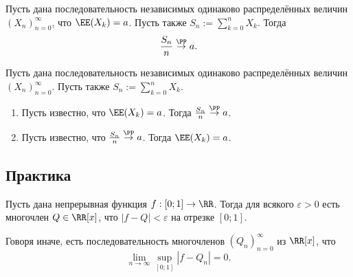 \documentclass[12pt,a4paper]{article}
\newcommand{\probto}{\mathrel{\stackrel{\PP}{\to}}}
\begin{document}
    \begin{theorem}[Хинчина]
        Пусть дана последовательность независимых одинаково распределённых величин $(X_n)_{n=0}^\infty$, что $\EE(X_k) = a$. Пусть также $S_n := \sum_{k=0}^n X_k$. Тогда
        \[\frac{S_n}{n} \probto a.\]
    \end{theorem}

    \begin{theorem}[Колмогорова]
        Пусть дана последовательность независимых одинаково распределённых величин $(X_n)_{n=0}^\infty$. Пусть также $S_n := \sum_{k=0}^n X_k$.
        \begin{enumerate}
            \item Пусть известно, что $\EE(X_k) = a$. Тогда $\frac{S_n}{n} \probto a$.
            \item Пусть известно, что $\frac{S_n}{n} \probto a$. Тогда $\EE(X_k) = a$.
        \end{enumerate}
    \end{theorem}

    \subsection{Практика}

    \begin{theorem}
        Пусть дана непрерывная функция $f: [0; 1] \to \RR$. Тогда для всякого $\varepsilon > 0$ есть многочлен $Q \in \RR[x]$, что $|f - Q| < \varepsilon$ на отрезке $[0; 1]$.

        Говоря иначе, есть последовательность многочленов $(Q_n)_{n=0}^\infty$ из $\RR[x]$, что
        \[\lim_{n \to \infty} \sup_{[0; 1]} |f - Q_n| = 0.\]
    \end{theorem}
\end{document}
